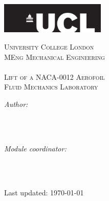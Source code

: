 \begin{titlepage}

  \newcommand{\HRule}{\rule{\linewidth}{0.5mm}} %


  \center
  \includegraphics[width=5cm]{Title/UCL.png}\\[1cm] %

  \center %


  \textsc{\LARGE University College London }\\[1.5cm]
  \textsc{\Large MEng Mechanical Engineering  }\\[0.5cm]
  \textsc{\large \mymodulename }\\[1.5cm]

  \makeatletter
  { \huge \textsc{Lift of a NACA-0012 Aerofoil\\[0.25cm]Fluid Mechanics Laboratory}}\\[1.5cm] %


  \begin{minipage}{0.4\textwidth}
    \begin{flushleft} \large
      \emph{Author:}\\
      \myauthor
      \\[1.2em]
    \end{flushleft}
  \end{minipage}
  ~
  \begin{minipage}{0.4\textwidth}
    \begin{flushright} \large
      \emph{Module coordinator:} \\
      \myprof \\[1.2em]
    \end{flushright}
  \end{minipage}\\[2cm]
  \makeatother


  {\large Last updated: \today}\\[2cm]
  \vfill %

\end{titlepage}